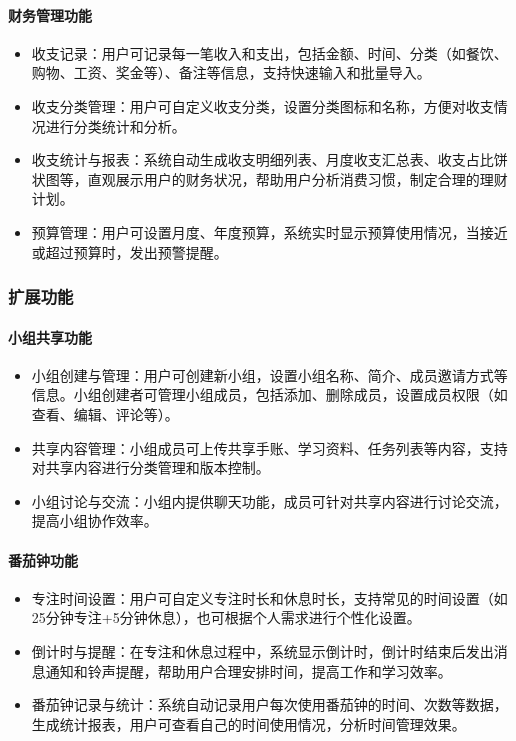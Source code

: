 \documentclass[a4paper]{article}
\begin{document}
\paragraph{财务管理功能}

\begin{itemize}
    \item 收支记录：用户可记录每一笔收入和支出，包括金额、时间、分类（如餐饮、购物、工资、奖金等）、备注等信息，支持快速输入和批量导入。
    \item 收支分类管理：用户可自定义收支分类，设置分类图标和名称，方便对收支情况进行分类统计和分析。
    \item 收支统计与报表：系统自动生成收支明细列表、月度收支汇总表、收支占比饼状图等，直观展示用户的财务状况，帮助用户分析消费习惯，制定合理的理财计划。
    \item 预算管理：用户可设置月度、年度预算，系统实时显示预算使用情况，当接近或超过预算时，发出预警提醒。
\end{itemize}

\subsubsection{扩展功能}

\paragraph{小组共享功能}

\begin{itemize}
    \item 小组创建与管理：用户可创建新小组，设置小组名称、简介、成员邀请方式等信息。小组创建者可管理小组成员，包括添加、删除成员，设置成员权限（如查看、编辑、评论等）。
    \item 共享内容管理：小组成员可上传共享手账、学习资料、任务列表等内容，支持对共享内容进行分类管理和版本控制。
    \item 小组讨论与交流：小组内提供聊天功能，成员可针对共享内容进行讨论交流，提高小组协作效率。
\end{itemize}

\paragraph{番茄钟功能}

\begin{itemize}
    \item 专注时间设置：用户可自定义专注时长和休息时长，支持常见的时间设置（如25分钟专注+5分钟休息），也可根据个人需求进行个性化设置。
    \item 倒计时与提醒：在专注和休息过程中，系统显示倒计时，倒计时结束后发出消息通知和铃声提醒，帮助用户合理安排时间，提高工作和学习效率。
    \item 番茄钟记录与统计：系统自动记录用户每次使用番茄钟的时间、次数等数据，生成统计报表，用户可查看自己的时间使用情况，分析时间管理效果。
\end{itemize}
\end{document}
